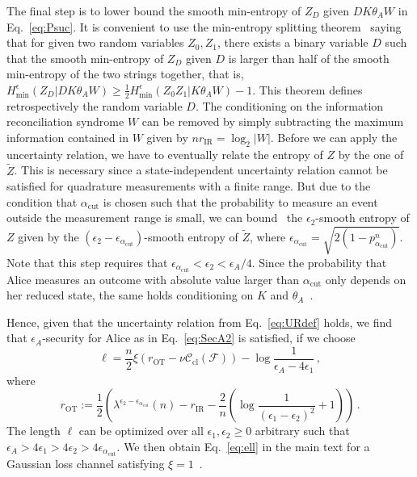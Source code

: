 \documentclass[aps,amsfonts,twoside,amssymb,superscriptaddress,twocolumn]{revtex4-1}
\newcommand*{\cC}{\mathcal{C}}
\newcommand*{\cF}{\mathcal{F}}
\newcommand*{\cl}{\textrm{cl}}
\newcommand*{\ec}{\textrm{IR}}
\newcommand*{\ot}{\textrm{OT}}
\begin{document}
The final step is to lower bound the smooth min-entropy of $Z_D$ given $ D  K \theta_A W$ in Eq.~\eqref{eq:Psuc}. It is convenient to use the min-entropy splitting theorem~\cite{damgaard2007} saying that for given two random variables $Z_0,Z_1$, there exists a binary variable $D$ such that the smooth min-entropy of $Z_D$ given $D$ is larger than half of the smooth min-entropy of the two strings together, that is, $H_{\min}^{\epsilon} (Z_D|DK\theta_A W) \geq \frac 12 H_{\min}^{\epsilon} (Z_0Z_1|K\theta_A W) - 1 $. This theorem defines retrospectively the random variable $D$.  The conditioning on the information reconciliation syndrome $W$ can be removed by simply subtracting the maximum information contained in $W$ given by $n r_{\ec} = \log_2 |W|$. Before we can apply the uncertainty relation, we have to eventually relate the entropy of $Z$ by the one of $\tilde Z$. This is necessary since a state-independent uncertainty relation cannot be satisfied for quadrature measurements with a finite range. But due to the condition that $\alpha_\text{cut}$ is chosen such that the probability to measure an event outside the measurement range is small, we can bound~\cite{Furrer2012CVQKD} the $\epsilon_2$-smooth entropy of $Z$ given by the $(\epsilon_2-\epsilon_{\alpha_\text{cut}})$-smooth entropy of $\tilde Z$, where $ \epsilon_{\alpha_\text{cut}} = \sqrt{2 (1-p_{\alpha_\text{cut}}^n)}$. Note that this step requires that $\epsilon_{\alpha_\text{cut}} < \epsilon_2 < \epsilon_A/4$. Since the probability that Alice measures an outcome with absolute value larger than $\alpha_\text{cut}$ only depends on her reduced state, the same holds conditioning on $K$ and $\theta_A$~\cite{Furrer2012CVQKD}. 

Hence, given that the uncertainty relation from Eq.~\eqref{eq:URdef} holds, we find that $\epsilon_A$-security for Alice as in Eq.~\eqref{eq:SecA2} is satisfied, if we choose
\begin{equation} \label{eq:ellapp}
\ell = \frac n 2 \xi (r_\ot - \nu \cC_\cl(\cF)) - \log\frac{1}{\epsilon_A-4\epsilon_1}   \, ,
\end{equation} 
where 
\begin{equation}
    r_\ot :=  \frac 12 \left( \lambda^{\epsilon_2- \epsilon_{\alpha_\text{cut}}}(n) - r_{\ec} - \frac 2 n (  \log\frac 1{(\epsilon_1-\epsilon_2)^2} + 1)\right) \,  .
\end{equation} 
The length $\ell$ can be optimized over all $\epsilon_1,\epsilon_2\geq 0$ arbitrary such that $\epsilon_A> 4\epsilon_1> 4\epsilon_2> 4 \epsilon_{\alpha_\text{cut}}$. 
We then obtain Eq.~\eqref{eq:ell} in the main text for a Gaussian loss channel satisfying $\xi=1$~\cite{wilde2014}. 
\end{document}
